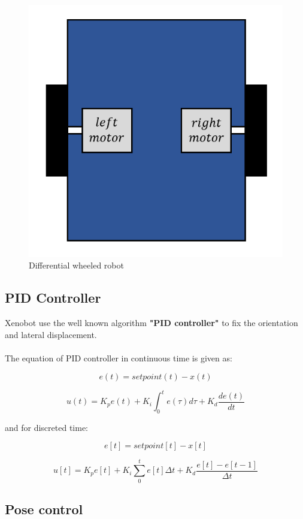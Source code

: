 \documentclass{article}
\begin{document}
\begin{figure}[ht]
  \label{fig:ground projection}
  \centering
  \includegraphics[scale=0.7]{graphs/differential_wheels.PNG}
  \caption{Differential wheeled robot}
\end{figure}
\FloatBarrier

\subsection{PID Controller}

Xenobot use the well known algorithm \textbf{"PID controller"} to fix the orientation and lateral displacement.
\\
\\
The equation of PID controller in continuous time is given as:

\[e(t) = setpoint(t) - x(t)\]

\[u(t) = K_p e(t) + K_i \int_{0}^{t} e(\tau) d\tau + K_d  \frac{de(t)}{dt}\]

\noindent and for discreted time:

\[e[t] = setpoint[t] - x[t]\]

\[u[t] = K_p e[t] + K_i \sum_0^t e[t] \Delta t + K_d \frac{e[t] - e[t-1]}{\Delta t}\]

\subsection{Pose control}
\end{document}
